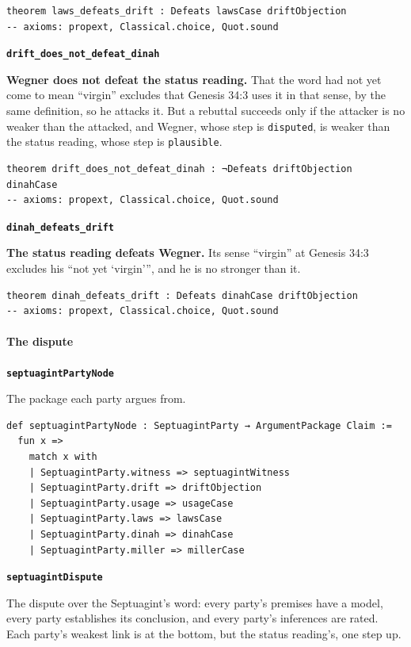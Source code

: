 \documentclass[11pt]{article}
\begin{document}
{\small\begin{verbatim}
theorem laws_defeats_drift : Defeats lawsCase driftObjection
-- axioms: propext, Classical.choice, Quot.sound
\end{verbatim}}
\par\medskip\noindent\textbf{\texttt{drift\_\allowbreak{}does\_\allowbreak{}not\_\allowbreak{}defeat\_\allowbreak{}dinah}}\par\nobreak\noindent
\textbf{Wegner does not defeat the status reading.} That the word had not yet come to mean “virgin” excludes that Genesis 34:3 uses it in that sense, by the same definition, so he attacks it. But a rebuttal succeeds only if the attacker is no weaker than the attacked, and Wegner, whose step is \texttt{disputed}, is weaker than the status reading, whose step is \texttt{plausible}.

{\small\begin{verbatim}
theorem drift_does_not_defeat_dinah : ¬Defeats driftObjection dinahCase
-- axioms: propext, Classical.choice, Quot.sound
\end{verbatim}}
\par\medskip\noindent\textbf{\texttt{dinah\_\allowbreak{}defeats\_\allowbreak{}drift}}\par\nobreak\noindent
\textbf{The status reading defeats Wegner.} Its sense “virgin” at Genesis 34:3 excludes his “not yet ‘virgin’”, and he is no stronger than it.

{\small\begin{verbatim}
theorem dinah_defeats_drift : Defeats dinahCase driftObjection
-- axioms: propext, Classical.choice, Quot.sound
\end{verbatim}}
\paragraph*{The dispute}
\leavevmode\par\nobreak
\par\medskip\noindent\textbf{\texttt{septuagint\allowbreak{}Party\allowbreak{}Node}}\par\nobreak\noindent
The package each party argues from.

{\small\begin{verbatim}
def septuagintPartyNode : SeptuagintParty → ArgumentPackage Claim :=
  fun x =>
    match x with
    | SeptuagintParty.witness => septuagintWitness
    | SeptuagintParty.drift => driftObjection
    | SeptuagintParty.usage => usageCase
    | SeptuagintParty.laws => lawsCase
    | SeptuagintParty.dinah => dinahCase
    | SeptuagintParty.miller => millerCase
\end{verbatim}}
\par\medskip\noindent\textbf{\texttt{septuagint\allowbreak{}Dispute}}\par\nobreak\noindent
The dispute over the Septuagint’s word: every party’s premises have a model, every party establishes its conclusion, and every party’s inferences are rated. Each party’s weakest link is at the bottom, but the status reading’s, one step up.
\end{document}
